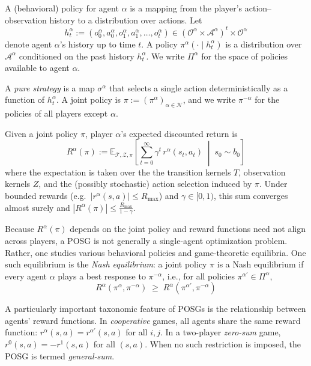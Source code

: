A (behavioral) policy for agent $\alpha$ is a mapping from the player's action--observation history to a distribution over actions.
Let
\[
h^\alpha_t := (o^\alpha_0,a^\alpha_0,o^\alpha_1,a^\alpha_1,\dots,o^\alpha_t)\in(\mathcal{O}^\alpha\times \mathcal{A}^\alpha)^t\times \mathcal{O}^\alpha
\]
denote agent $\alpha$'s history up to time $t$. A policy $\pi^\alpha(\cdot \mid h^\alpha_t)$ is a distribution over $\mathcal{A}^\alpha$ conditioned on the past history $h^\alpha_t$. We write $\Pi^\alpha$ for the space of policies available to agent $\alpha$.

A \emph{pure strategy} is a map $\sigma^\alpha$ that selects a single action deterministically as a function of $h^\alpha_t$. A joint policy is $\pi := (\pi^\alpha)_{\alpha\in \mathcal{N}}$, and we write $\pi^{-\alpha}$ for the policies of all players except $\alpha$.

Given a joint policy $\pi$, player $\alpha$'s expected discounted return is
\[
R^\alpha(\pi) := \mathbb{E}_{\mathcal{T},\mathcal{Z},\pi}\!\left[\sum_{t=0}^{\infty}\gamma^t\, r^\alpha(s_t,a_t)\;\middle|\; s_0\sim b_0\right]
\]
where the expectation is taken over the the transition kernels $T$, observation kernels $Z$, and the (possibly stochastic) action selection induced by $\pi$. Under bounded rewards (e.g.\ $|r^\alpha(s,a)|\le R_{\max}$) and $\gamma\in[0,1)$, this sum converges almost surely
and $|R^\alpha(\pi)|\le \frac{R_{\max}}{1-\gamma}$.

Because $R^\alpha(\pi)$ depends on the joint policy and reward functions need not align across players, a POSG is not generally a single-agent optimization problem. Rather, one studies various behavioral policies and game-theoretic equilibria. One such equilibrium is the \emph{Nash equilibrium}: a joint policy $\pi$ is a Nash equilibrium if every agent $\alpha$ plays a best response to $\pi^{-\alpha}$, i.e., for all policies $\pi^{\alpha'}\in \Pi^\alpha$,
\[
R^\alpha(\pi^\alpha,\pi^{-\alpha}) \;\ge\; R^{\alpha}(\pi^{\alpha'},\pi^{-\alpha})
\]


A particularly important taxonomic feature of POSGs is the relationship between agents' reward functions. In \emph{cooperative} games, all agents share the same reward function: $r^\alpha(s,a)=r^{\alpha'}(s,a)$ for all $i,j$. In a two-player \emph{zero-sum} game,
$r^0(s,a)=-r^1(s,a)$ for all $(s,a)$. When no such restriction is imposed, the POSG is termed \emph{general-sum}.


